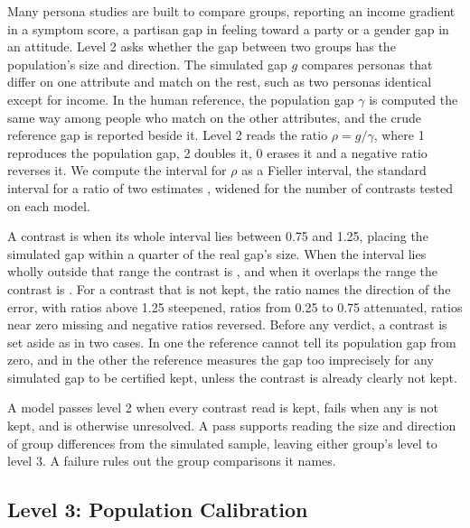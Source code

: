 Many persona studies are built to compare groups, reporting an income gradient in a symptom score, a partisan gap in feeling toward a party or a gender gap in an attitude.
Level 2 asks whether the gap between two groups has the population's size and direction.
The simulated gap $g$ compares personas that differ on one attribute and match on the rest, such as two personas identical except for income.
In the human reference, the population gap $\gamma$ is computed the same way among people who match on the other attributes, and the crude reference gap is reported beside it.
Level 2 reads the ratio $\rho = g/\gamma$, where 1 reproduces the population gap, 2 doubles it, 0 erases it and a negative ratio reverses it.
We compute the interval for $\rho$ as a Fieller interval, the standard interval for a ratio of two estimates \citep{fieller1954interval}, widened for the number of contrasts tested on each model.

A contrast is  when its whole interval lies between 0.75 and 1.25, placing the simulated gap within a quarter of the real gap's size.
When the interval lies wholly outside that range the contrast is , and when it overlaps the range the contrast is .
For a contrast that is not kept, the ratio names the direction of the error, with ratios above 1.25 steepened, ratios from 0.25 to 0.75 attenuated, ratios near zero missing and negative ratios reversed.
Before any verdict, a contrast is set aside as  in two cases.
In one the reference cannot tell its population gap from zero, and in the other the reference measures the gap too imprecisely for any simulated gap to be certified kept, unless the contrast is already clearly not kept.

A model passes level 2 when every contrast read is kept, fails when any is not kept, and is otherwise unresolved.
A pass supports reading the size and direction of group differences from the simulated sample, leaving either group's level to level 3.
A failure rules out the group comparisons it names.

\subsection{Level 3: Population Calibration}
\label{sec:l3-method}

